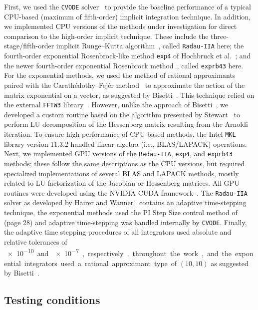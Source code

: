 \documentclass[final,twocolumn]{elsarticle}
\begin{document}
First, we used the \texttt{CVODE} solver~\cite{Hindmarsh:2005hg} to provide the baseline performance of a typical CPU-based (maximum of fifth-order) implicit integration technique.
In addition, we implemented CPU versions of the methods under investigation for direct comparison to the high-order implicit technique.
These include the three-stage/fifth-order implicit Runge--Kutta algorithm~\cite{wanner1991solving}, called \texttt{Radau-IIA} here; the fourth-order exponential Rosenbrock-like method \texttt{exp4} of Hochbruck et al.~\cite{Hochbruck:1998}; and the newer fourth-order exponential Rosenbrock method~\cite{Hockbruck:2009}, called \texttt{exprb43} here.
For the exponential methods, we used the method of rational approximants~\cite{gallopoulos:1992} paired with the Carath\'edothy--Fej\'er method~\cite{trefethen:2006} to approximate the action of the matrix exponential on a vector, as suggested by Bisetti~\cite{Bisetti:2012jw}.
This technique relied on the external \texttt{FFTW3} library~\cite{frigo2005design}.
However, unlike the approach of Bisetti~\cite{Bisetti:2012jw}, we developed a custom routine based on the algorithm presented by Stewart~\cite{stewart:1998} to perform LU decomposition of the Hessenberg matrix resulting from the Arnoldi iteration.
To ensure high performance of CPU-based methods, the Intel \texttt{MKL} library version 11.3.2 handled linear algebra (i.e., BLAS/LAPACK) operations.
Next, we implemented GPU versions of the \texttt{Radau-IIA}, \texttt{exp4}, and \texttt{exprb43} methods; these follow the same descriptions as the CPU versions, but required specialized implementations of several BLAS and LAPACK methods, mostly related to LU factorization of the Jacobian or Hessenberg matrices.
All GPU routines were developed using the NVIDIA CUDA framework~\cite{Buck:2008aa,NVIDIA:2015aa}.
The \texttt{Radau-IIA} solver as developed by Hairer and Wanner~\cite{wanner1991solving} contains an adaptive time-stepping technique, the exponential methods used the PI Step Size control method of~\cite{wanner1991solving} (page 28) and adaptive time-stepping was handled internally by \texttt{CVODE}.
Finally, the adaptive time stepping procedures of all integrators used absolute and relative tolerances of \SI{e-10} and \SI{e-7}, respectively, throughout the work, and the exponential integrators used a rational approximant type of $\left(10,10\right)$ as suggested by Bisetti~\cite{Bisetti:2012jw}.

\subsection{Testing conditions}
\label{S:pasr_conditions}
\end{document}
